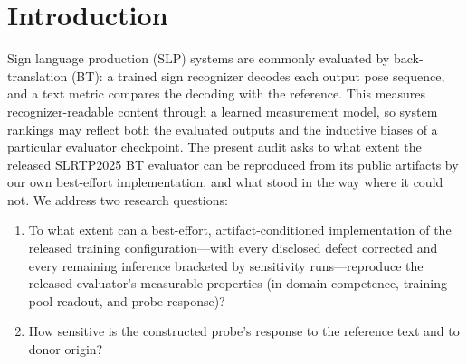 \documentclass[pdflatex,sn-chicago]{sn-jnl}
\begin{document}
\section{Introduction}

Sign language production (SLP) systems are commonly evaluated by back-translation (BT): a trained sign recognizer decodes each output pose sequence, and a text metric compares the decoding with the reference. This measures recognizer-readable content through a learned measurement model, so system rankings may reflect both the evaluated outputs and the inductive biases of a particular evaluator checkpoint. The present audit asks to what extent the released SLRTP2025 BT evaluator can be reproduced from its public artifacts by our own best-effort implementation, and what stood in the way where it could not. We address two research questions:

\begin{enumerate}
\item[RQ1.] To what extent can a best-effort, artifact-conditioned implementation of the released training configuration---with every disclosed defect corrected and every remaining inference bracketed by sensitivity runs---reproduce the released evaluator's measurable properties (in-domain competence, training-pool readout, and probe response)?
\item[RQ2.] How sensitive is the constructed probe's response to the reference text and to donor origin?
\end{enumerate}
\end{document}
